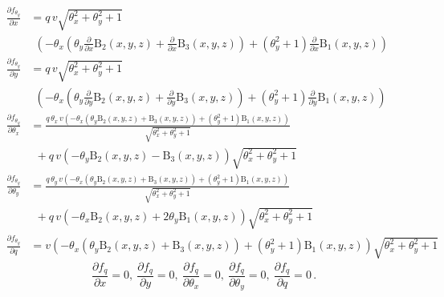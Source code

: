     \begin{align}
        \frac{\partial f_{\theta_y}}{\partial x} &=
        q\,v \sqrt{\theta_{x}^{2} + \theta_{y}^{2} + 1} \nonumber\\
        &~~ \left(- \theta_{x} \left(\theta_{y} \frac{\partial}{\partial x} \operatorname{B_{2}}{\left (x,y,z \right )} + \frac{\partial}{\partial x} \operatorname{B_{3}}{\left (x,y,z \right )}\right) + \left(\theta_{y}^{2} + 1\right) \frac{\partial}{\partial x} \operatorname{B_{1}}{\left (x,y,z \right )}\right) \label{eq:tf_dty_dx}\\
        \frac{\partial f_{\theta_y}}{\partial y} &=
        q\, v \sqrt{\theta_{x}^{2} + \theta_{y}^{2} + 1} \nonumber\\
        &~~ \left(- \theta_{x} \left(\theta_{y} \frac{\partial}{\partial y} \operatorname{B_{2}}{\left (x,y,z \right )} + \frac{\partial}{\partial y} \operatorname{B_{3}}{\left (x,y,z \right )}\right) + \left(\theta_{y}^{2} + 1\right) \frac{\partial}{\partial y} \operatorname{B_{1}}{\left (x,y,z \right )}\right) \label{eq:tf_dty_dy}\\
        \frac{\partial f_{\theta_y}}{\partial \theta_x} &=
        \frac{q\, \theta_{x}\, v \left(- \theta_{x} \left(\theta_{y} \operatorname{B_{2}}{\left (x,y,z \right )} + \operatorname{B_{3}}{\left (x,y,z \right )}\right) + \left(\theta_{y}^{2} + 1\right) \operatorname{B_{1}}{\left (x,y,z \right )}\right)}{\sqrt{\theta_{x}^{2} + \theta_{y}^{2} + 1}}  \nonumber\\
        &~~ + q\, v \left(- \theta_{y} \operatorname{B_{2}}{\left (x,y,z \right )} - \operatorname{B_{3}}{\left (x,y,z \right )}\right) \sqrt{\theta_{x}^{2} + \theta_{y}^{2} + 1} \nonumber\\
        \frac{\partial f_{\theta_y}}{\partial \theta_y} &=
        \frac{q\, \theta_{y}\, v \left(- \theta_{x} \left(\theta_{y} \operatorname{B_{2}}{\left (x,y,z \right )} + \operatorname{B_{3}}{\left (x,y,z \right )}\right) + \left(\theta_{y}^{2} + 1\right) \operatorname{B_{1}}{\left (x,y,z \right )}\right)}{\sqrt{\theta_{x}^{2} + \theta_{y}^{2} + 1}} \nonumber\\
        &~~ + q\, v \left(- \theta_{x} \operatorname{B_{2}}{\left (x,y,z \right )} + 2 \theta_{y} \operatorname{B_{1}}{\left (x,y,z \right )}\right) \sqrt{\theta_{x}^{2} + \theta_{y}^{2} + 1} \nonumber\\
        \frac{\partial f_{\theta_y}}{\partial q} &=
        v \left(- \theta_{x} \left(\theta_{y} \operatorname{B_{2}}{\left (x,y,z \right )} + \operatorname{B_{3}}{\left (x,y,z \right )}\right) + \left(\theta_{y}^{2} + 1\right) \operatorname{B_{1}}{\left (x,y,z \right )}\right) \sqrt{\theta_{x}^{2} + \theta_{y}^{2} + 1} \nonumber
    \end{align}
    \begin{equation*}
        \frac{\partial f_q}{\partial x} = 0,~
        \frac{\partial f_q}{\partial y} = 0,~
        \frac{\partial f_q}{\partial \theta_x} = 0,~
        \frac{\partial f_q}{\partial \theta_y} = 0,~
        \frac{\partial f_q}{\partial q} = 0\,.
    \end{equation*}

